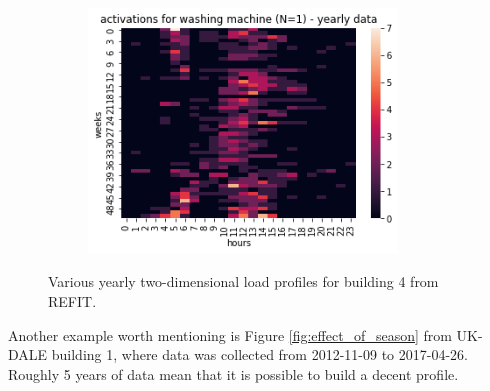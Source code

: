 \begin{figure}[H]
\begin{subfigure}{.32\textwidth}
		\includegraphics[width=0.9\textwidth]{../Figures/LPS/HM_Ywh_wm.png}
		\label{fig:HM_Ywh_wm}
	\end{subfigure}%
	
	\caption{Various yearly two-dimensional load profiles for building 4 from REFIT.}
	\label{fig:var_2d_lpss}
\end{figure}

Another example worth mentioning is Figure \ref{fig:effect_of_season} from UK-DALE building 1, where data was collected from 2012-11-09 to 2017-04-26.
Roughly 5 years of data mean that it is possible to build a decent profile. 

